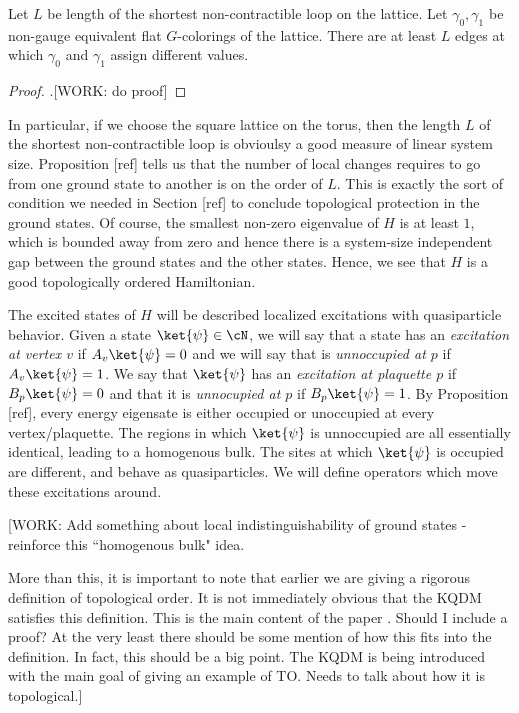 \begin{prop} Let $L$ be length of the shortest non-contractible loop on the lattice. Let $\gamma_0,\gamma_1$ be non-gauge equivalent flat $G$-colorings of the lattice. There are at least $L$ edges at which $\gamma_0$ and $\gamma_1$ assign different values.
\end{prop} 
\begin{proof}.[WORK: do proof]
\end{proof}

In particular, if we choose the square lattice on the torus, then the length $L$ of the shortest non-contractible loop is obvioulsy a good measure of linear system size. Proposition [ref] tells us that the number of local changes requires to go from one ground state to another is on the order of $L$. This is exactly the sort of condition we needed in Section [ref] to conclude topological protection in the ground states. Of course, the smallest non-zero eigenvalue of $H$ is at least $1$, which is bounded away from zero and hence there is a system-size independent gap between the ground states and the other states. Hence, we see that $H$ is a good topologically ordered Hamiltonian. 

The excited states of $H$ will be described localized excitations with quasiparticle behavior. Given a state $\ket{\psi}\in \cN$, we will say that a state has an \textit{excitation at vertex $v$} if $A_v\ket{\psi}=0$ and we will say that is \textit{unnoccupied at $p$} if $A_v\ket{\psi}=1$. We say that $\ket{\psi}$ has an \textit{excitation at plaquette $p$} if $B_p\ket{\psi}=0$ and that it is \textit{unnocupied at $p$} if $B_p\ket{\psi}=1$. By Proposition [ref], every energy eigensate is either occupied or unoccupied at every vertex/plaquette. The regions in which $\ket{\psi}$ is unnoccupied are all essentially identical, leading to a homogenous bulk. The sites at which $\ket{\psi}$ is occupied are different, and behave as quasiparticles. We will define operators which move these excitations around.

[WORK: Add something about local indistinguishability of ground states - reinforce this ``homogenous bulk" idea.

More than this, it is important to note that earlier we are giving a rigorous definition of topological order. It is not immediately obvious that the KQDM satisfies this definition. This is the main content of the paper \cite{cui2020kitaev}. Should I include a proof? At the very least there should be some mention of how this fits into the definition. In fact, this should be a big point. The KQDM is being introduced with the main goal of giving an example of TO. Needs to talk about how it is topological.]

